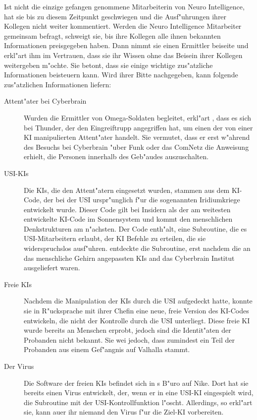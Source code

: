 Ist \ml{} nicht die einzige gefangen genommene Mitarbeiterin von Neuro Intelligence, hat sie bis zu diesem Zeitpunkt geschwiegen und die Ausf"uhrungen ihrer Kollegen nicht weiter kommentiert. Werden die Neuro Intelligence Mitarbeiter gemeinsam befragt, schweigt sie, bis ihre Kollegen alle ihnen bekannten Informationen preisgegeben haben. Dann nimmt sie einen Ermittler beiseite und erkl"art ihm im Vertrauen, dass sie ihr Wissen ohne das Beisein ihrer Kollegen weitergeben m"ochte. Sie betont, dass sie einige wichtige zus"atzliche Informationen beisteuern kann. Wird ihrer Bitte nachgegeben, kann \ml{} folgende zus"atzlichen Informationen liefern:

\begin{description}
	\item[Attent"ater bei Cyberbrain] Wurden die Ermittler von Omega-Soldaten begleitet, erkl"art \ml{}, dass es sich bei Thunder, der den 	
		Eingreiftrupp angegriffen hat, um einen der von einer KI manipulierten Attent"ater handelt. Sie vermutet, dass er erst w"ahrend des Besuchs bei Cyberbrain "uber Funk oder das ComNetz die Anweisung erhielt, die Personen innerhalb des Geb"audes auszuschalten.
    \item[USI-KIs] Die KIs, die den Attent"atern eingesetzt wurden, stammen aus dem KI-Code, der bei der USI urspr"unglich f"ur die 
		sogenannten Iridiumkriege entwickelt wurde. Dieser Code gilt bei Insidern als der am weitesten entwickelte KI-Code im Sonnensystem und kommt den menschlichen Denkstrukturen am n"achsten. Der Code enth"alt, eine Subroutine, die es USI-Mitarbeitern erlaubt, der KI Befehle zu erteilen, die sie widerspruchslos ausf"uhren. \ml{} entdeckte die Subroutine, erst nachdem die an das menschliche Gehirn angepassten KIs and das Cyberbrain Institut ausgeliefert waren.
	\item[Freie KIs] Nachdem \ml{} die Manipulation der KIs durch die USI aufgedeckt hatte, konnte sie in R"ucksprache mit ihrer Chefin eine 
		neue, freie Version des KI-Codes entwickeln, die nicht der Kontrolle durch die USI unterliegt. Diese freie KI wurde bereits an Menschen erprobt, jedoch sind \ml{} die Identit"aten der Probanden nicht bekannt. Sie wei\3 jedoch, dass zumindest ein Teil der Probanden aus einem Gef"angnis auf Valhalla stammt.
	\item[Der Virus] Die Software der freien KIs befindet sich in \ml{}s B"uro auf Nike. Dort hat sie bereits einen Virus entwickelt, der, 
		wenn er in eine USI-KI eingespielt wird, die Subroutine mit der USI-Kontrollfunktion l"oscht. Allerdings, so erkl"art sie, kann au\3er ihr niemand den Virus f"ur die Ziel-KI vorbereiten.
\end{description}


